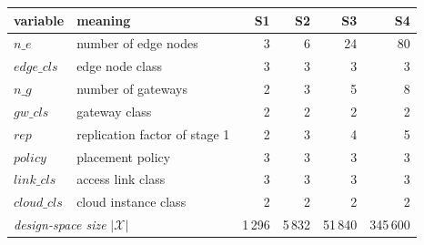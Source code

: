 \scriptsize
\begin{tabular}{llrrrr}
\toprule
variable & meaning & S1 & S2 & S3 & S4 \\
\midrule
$\mathit{n\_e}$ & number of edge nodes & 3 & 6 & 24 & 80 \\
$\mathit{edge\_cls}$ & edge node class & 3 & 3 & 3 & 3 \\
$\mathit{n\_g}$ & number of gateways & 2 & 3 & 5 & 8 \\
$\mathit{gw\_cls}$ & gateway class & 2 & 2 & 2 & 2 \\
$\mathit{rep}$ & replication factor of stage 1 & 2 & 3 & 4 & 5 \\
$\mathit{policy}$ & placement policy & 3 & 3 & 3 & 3 \\
$\mathit{link\_cls}$ & access link class & 3 & 3 & 3 & 3 \\
$\mathit{cloud\_cls}$ & cloud instance class & 2 & 2 & 2 & 2 \\
\midrule
\multicolumn{2}{l}{\emph{design-space size} $|\mathcal{X}|$} & 1\,296 & 5\,832 & 51\,840 & 345\,600 \\
\bottomrule
\end{tabular}
